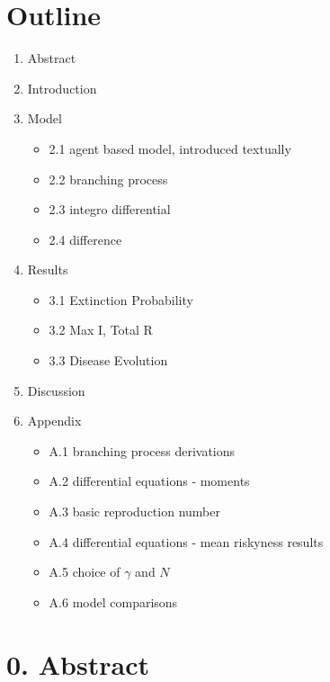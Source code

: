 \section{Outline}\label{outline}

\begin{enumerate}
\def\labelenumi{\arabic{enumi}.}
\setcounter{enumi}{-1}
\tightlist
\item
  Abstract
\item
  Introduction
\item
  Model

  \begin{itemize}
  \tightlist
  \item
    2.1 agent based model, introduced textually
  \item
    2.2 branching process
  \item
    2.3 integro differential
  \item
    2.4 difference
  \end{itemize}
\item
  Results

  \begin{itemize}
  \tightlist
  \item
    3.1 Extinction Probability
  \item
    3.2 Max I, Total R
  \item
    3.3 Disease Evolution
  \end{itemize}
\item
  Discussion
\item
  Appendix

  \begin{itemize}
  \tightlist
  \item
    A.1 branching process derivations
  \item
    A.2 differential equations - moments
  \item
    A.3 basic reproduction number
  \item
    A.4 differential equations - mean riskyness results
  \item
    A.5 choice of \(\gamma\) and \(N\)
  \item
    A.6 model comparisons
  \end{itemize}
\end{enumerate}

\section{0. Abstract}\label{abstract}

